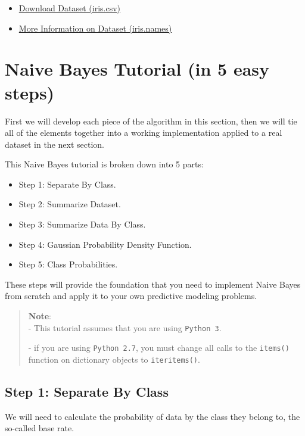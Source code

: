 \documentclass[12pt]{article}
\begin{document}
\begin{itemize}
	\item \href{https://raw.githubusercontent.com/jbrownlee/Datasets/master/iris.csv}{Download Dataset (iris.csv)}
	\item \href{https://raw.githubusercontent.com/jbrownlee/Datasets/master/iris.names}{More Information on Dataset (iris.names)}
\end{itemize}

\newpage

\section{Naive Bayes Tutorial (in 5 easy steps)}

First we will develop each piece of the algorithm in this section, then we will tie all of the elements together into a working implementation applied to a real dataset in the next section.

This Naive Bayes tutorial is broken down into 5 parts:

\begin{itemize}
	\item Step 1: Separate By Class.
	\item Step 2: Summarize Dataset.
	\item Step 3: Summarize Data By Class.
	\item Step 4: Gaussian Probability Density Function.
	\item Step 5: Class Probabilities.
\end{itemize}

These steps will provide the foundation that you need to implement Naive Bayes from scratch and apply it to your own predictive modeling problems.

\begin{quote}
\textbf{Note}:\\

- This tutorial assumes that you are using \verb|Python 3|.

- if you are using \verb|Python 2.7|, you must change all calls to the \verb|items()| function on dictionary objects to \verb|iteritems()|.
\end{quote}

\subsection{Step 1: Separate By Class}

We will need to calculate the probability of data by the class they belong to, the so-called base rate.\\
\end{document}
